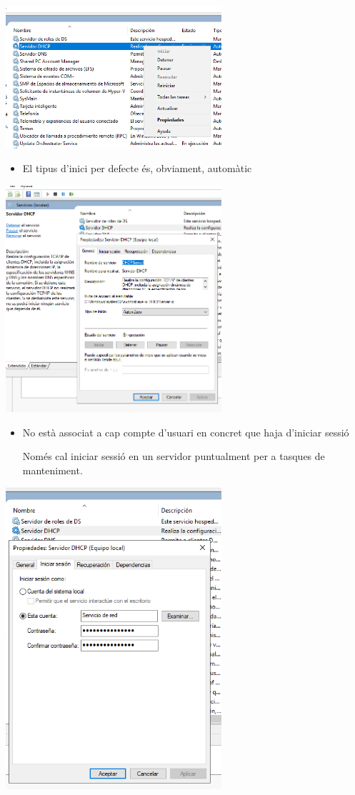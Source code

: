 \documentclass[
  a4paper,
]{article}
\providecommand{\tightlist}{%
  \setlength{\itemsep}{0pt}\setlength{\parskip}{0pt}}
\begin{document}
\includegraphics[width=0.6\textwidth,height=\textheight]{png/ServiciDHCP0.png}

\begin{itemize}
\tightlist
\item
  El tipus d'inici per defecte és, obviament, automàtic
\end{itemize}

\includegraphics[width=0.6\textwidth,height=\textheight]{png/ServiciDHCP1.png}

\begin{itemize}
\item
  No està associat a cap compte d'usuari en concret que haja d'iniciar
  sessió

  Només cal iniciar sessió en un servidor puntualment per a tasques de
  manteniment.
\end{itemize}

\includegraphics[width=0.6\textwidth,height=\textheight]{png/ServiciDHCP2.png}
\end{document}
